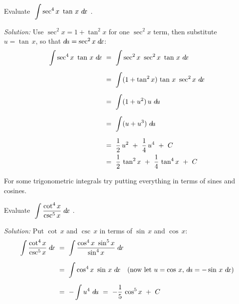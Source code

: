 \begin{exmp}\label{exmp:trigint5}
\noindent Evaluate $~\displaystyle\int \sec^4 x ~\tan\,x~d\!x~$.\vspace{1mm}
\par\noindent\emph{Solution:} Use $\sec^2 x = 1 + \tan^2 x$ for one $\sec^2 x$
term, then substitute $u=\tan\,x$, so that $d\!u=\sec^2 x\;d\!x$:
\begin{align*}
\int \sec^4 x ~\tan\,x~d\!x ~&=~ \int \sec^2 x~\sec^2 x~\tan\,x~d\!x\\[6pt]
&=~ \int (1 + \tan^2 x)\,\tan\,x~\sec^2 x~d\!x\\[6pt]
&=~ \int (1 + u^2)\,u~d\!u\\[6pt]
&=~ \int (u + u^3)~d\!u\\[6pt]
&=~ \frac{1}{2}\,u^2 ~+~ \frac{1}{4}\,u^4 ~+~ C\\
&=~ \frac{1}{2}\,\tan^2 x ~+~ \frac{1}{4}\,\tan^4 x ~+~ C
\end{align*}
\end{exmp}
\divider
\newpage
For some trigonometric integrals try putting everything in terms of sines and
cosines.
\begin{exmp}\label{exmp:trigint6}
\noindent Evaluate $~\displaystyle\int \dfrac{\cot^4 x}{\csc^5 x}\;d\!x~$.\vspace{1mm}
\par\noindent\emph{Solution:} Put $\cot\,x$ and $\csc\,x$ in terms of $\sin\,x$
and $\cos\,x$:
\begin{align*}
\int \frac{\cot^4x}{\csc^5 x}\;d\!x ~&=~ \int \frac{\cos^4x~\sin^5 x}{\sin^4 x}\;d\!x\\[6pt]
&=~ \int \cos^4 x~\sin\,x~d\!x\quad\text{(now let $u=\cos\,x$, $d\!u=-\sin\,x~d\!x$)}\\[6pt]
&=~ -\int u^4~d\!u ~=~ -\frac{1}{5}\,\cos^5 x ~+~ C
\end{align*}
\end{exmp}
\divider
\vspace{3mm}
\startexercises\label{sec6dot2}
